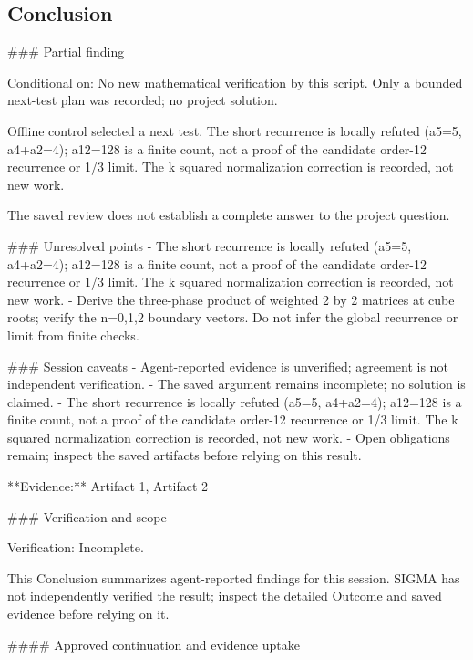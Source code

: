 \documentclass[11pt]{article}
\begin{document}
\subsection{Conclusion}
\#\#\# Partial finding

Conditional on: No new mathematical verification by this script. Only a bounded next-test plan was recorded; no project solution.

Offline control selected a next test. The short recurrence is locally refuted (a5=5, a4+a2=4); a12=128 is a finite count, not a proof of the candidate order-12 recurrence or 1/3 limit. The k squared normalization correction is recorded, not new work.

The saved review does not establish a complete answer to the project question.

\#\#\# Unresolved points
- The short recurrence is locally refuted (a5=5, a4+a2=4); a12=128 is a finite count, not a proof of the candidate order-12 recurrence or 1/3 limit. The k squared normalization correction is recorded, not new work.
- Derive the three-phase product of weighted 2 by 2 matrices at cube roots; verify the n=0,1,2 boundary vectors. Do not infer the global recurrence or limit from finite checks.

\#\#\# Session caveats
- Agent-reported evidence is unverified; agreement is not independent verification.
- The saved argument remains incomplete; no solution is claimed.
- The short recurrence is locally refuted (a5=5, a4+a2=4); a12=128 is a finite count, not a proof of the candidate order-12 recurrence or 1/3 limit. The k squared normalization correction is recorded, not new work.
- Open obligations remain; inspect the saved artifacts before relying on this result.

**Evidence:** Artifact 1, Artifact 2

\#\#\# Verification and scope

Verification: Incomplete.

This Conclusion summarizes agent-reported findings for this session. SIGMA has not independently verified the result; inspect the detailed Outcome and saved evidence before relying on it.

\#\#\#\# Approved continuation and evidence uptake
\end{document}
